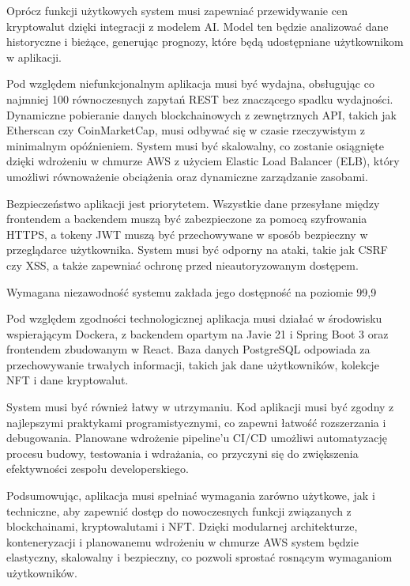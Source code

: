 Oprócz funkcji użytkowych system musi zapewniać przewidywanie cen kryptowalut dzięki integracji z modelem AI. Model ten będzie analizować dane historyczne i bieżące, generując prognozy, które będą udostępniane użytkownikom w aplikacji.

Pod względem niefunkcjonalnym aplikacja musi być wydajna, obsługując co najmniej 100 równoczesnych zapytań REST bez znaczącego spadku wydajności. Dynamiczne pobieranie danych blockchainowych z zewnętrznych API, takich jak Etherscan czy CoinMarketCap, musi odbywać się w czasie rzeczywistym z minimalnym opóźnieniem. System musi być skalowalny, co zostanie osiągnięte dzięki wdrożeniu w chmurze AWS z użyciem Elastic Load Balancer (ELB), który umożliwi równoważenie obciążenia oraz dynamiczne zarządzanie zasobami.

Bezpieczeństwo aplikacji jest priorytetem. Wszystkie dane przesyłane między frontendem a backendem muszą być zabezpieczone za pomocą szyfrowania HTTPS, a tokeny JWT muszą być przechowywane w sposób bezpieczny w przeglądarce użytkownika. System musi być odporny na ataki, takie jak CSRF czy XSS, a także zapewniać ochronę przed nieautoryzowanym dostępem.

Wymagana niezawodność systemu zakłada jego dostępność na poziomie 99,9%

Pod względem zgodności technologicznej aplikacja musi działać w środowisku wspierającym Dockera, z backendem opartym na Javie 21 i Spring Boot 3 oraz frontendem zbudowanym w React. Baza danych PostgreSQL odpowiada za przechowywanie trwałych informacji, takich jak dane użytkowników, kolekcje NFT i dane kryptowalut.

System musi być również łatwy w utrzymaniu. Kod aplikacji musi być zgodny z najlepszymi praktykami programistycznymi, co zapewni łatwość rozszerzania i debugowania. Planowane wdrożenie pipeline’u CI/CD umożliwi automatyzację procesu budowy, testowania i wdrażania, co przyczyni się do zwiększenia efektywności zespołu developerskiego.

Podsumowując, aplikacja musi spełniać wymagania zarówno użytkowe, jak i techniczne, aby zapewnić dostęp do nowoczesnych funkcji związanych z blockchainami, kryptowalutami i NFT. Dzięki modularnej architekturze, konteneryzacji i planowanemu wdrożeniu w chmurze AWS system będzie elastyczny, skalowalny i bezpieczny, co pozwoli sprostać rosnącym wymaganiom użytkowników.

